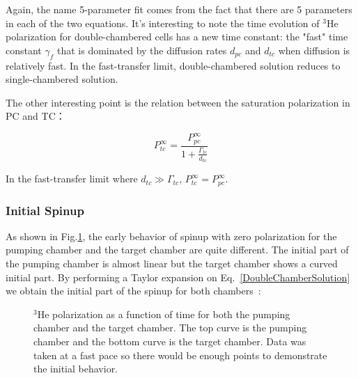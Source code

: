 Again, the name 5-parameter fit comes from the fact that there are 5 parameters in each of the two equations. It's interesting to note the time evolution of $^{3}$He polarization for double-chambered cells has a new time constant: the "fast" time constant $\gamma_{f}$ that is dominated by the diffusion rates $d_{pc}$ and $d_{tc}$ when diffusion is relatively fast. In the fast-transfer limit, double-chambered solution reduces to single-chambered solution. 

The other interesting point is the relation between the saturation polarization in PC and TC：

\begin{equation}
P_{tc}^{\infty}=\frac{P_{pc}^{\infty}}{1+\frac{\Gamma_{tc}}{d_{tc}}}
\end{equation}

In the fast-transfer limit where $d_{tc}\gg \Gamma_{tc}$, $P_{tc}^{\infty}=P_{pc}^{\infty}$. 

\subsubsection{Initial Spinup}

As shown in Fig.\ref{BradySpinup}, the early behavior of spinup with zero polarization for the pumping chamber and the target chamber are quite different. The initial part of the pumping chamber is almost linear but the target chamber shows a curved initial part. By performing a Taylor expansion on Eq.~\ref{DoubleChamberSolution} we obtain the initial part of the spinup for both chambers~\cite{PhysRevC.84.065201}:

\begin{figure}[t!]
	\centering
	\caption{{$^{3}$He polarization as a function of time for both the pumping chamber and the target chamber. The top curve is the pumping chamber and the bottom curve is the target chamber. Data was taken at a fast pace so there would be enough points to demonstrate the initial behavior. }}
	\label{BradySpinup}
\end{figure}

